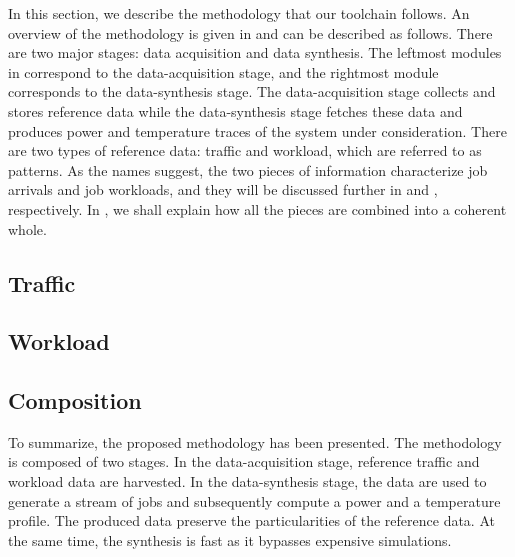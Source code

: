 In this section, we describe the methodology that our toolchain follows. An
overview of the methodology is given in  and can be described
as follows. There are two major stages: data acquisition and data synthesis. The
leftmost modules in  correspond to the data-acquisition stage,
and the rightmost module corresponds to the data-synthesis stage. The
data-acquisition stage collects and stores reference data while the
data-synthesis stage fetches these data and produces power and temperature
traces of the system under consideration. There are two types of reference data:
traffic and workload, which are referred to as patterns. As the names suggest,
the two pieces of information characterize job arrivals and job workloads, and
they will be discussed further in  and ,
respectively. In , we shall explain how all the pieces are
combined into a coherent whole.

\subsection{Traffic} 


\subsection{Workload} 


\subsection{Composition} 


To summarize, the proposed methodology has been presented. The methodology is
composed of two stages. In the data-acquisition stage, reference traffic and
workload data are harvested. In the data-synthesis stage, the data are used to
generate a stream of jobs and subsequently compute a power and a temperature
profile. The produced data preserve the particularities of the reference data.
At the same time, the synthesis is fast as it bypasses expensive simulations.
